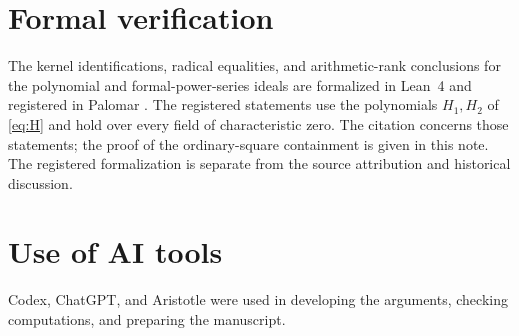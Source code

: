 \documentclass[11pt]{amsart}
\theoremstyle{remark}
\begin{document}
\section*{Formal verification}

The kernel identifications, radical equalities, and arithmetic-rank conclusions for the polynomial and formal-power-series ideals are formalized in Lean~4 and registered in Palomar \cite{Gurung2026Formalization}. The registered statements use the polynomials $H_1,H_2$ of \eqref{eq:H} and hold over every field of characteristic zero. The citation concerns those statements; the proof of the ordinary-square containment is given in this note. The registered formalization is separate from the source attribution and historical discussion.

\section*{Use of AI tools}

Codex, ChatGPT, and Aristotle were used in developing the arguments, checking computations, and preparing the manuscript.
\end{document}
